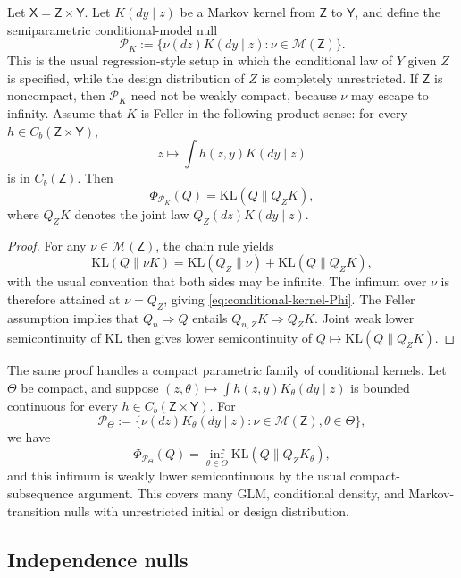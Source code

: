 \documentclass[11pt]{article}
\newcommand{\KL}{\mathrm{KL}}
\newcommand{\Pcal}{\mathcal{P}}
\newcommand{\X}{\mathsf{X}}
\newcommand{\M}{\mathcal{M}}
\theoremstyle{definition}
\theoremstyle{definition}
\begin{document}
Let \(\X=\mathsf Z\times\mathsf Y\).  Let \(K(dy\mid z)\) be a Markov kernel from \(\mathsf Z\) to \(\mathsf Y\), and define the semiparametric conditional-model null
\[
  \Pcal_K:=\{\nu(dz)K(dy\mid z):\nu\in\M(\mathsf Z)\}.
\]
This is the usual regression-style setup in which the conditional law of \(Y\) given \(Z\) is specified, while the design distribution of \(Z\) is completely unrestricted.  If \(\mathsf Z\) is noncompact, then \(\Pcal_K\) need not be weakly compact, because \(\nu\) may escape to infinity.  Assume that \(K\) is Feller in the following product sense: for every \(h\in C_b(\mathsf Z\times\mathsf Y)\),
\[
  z\mapsto \int h(z,y)K(dy\mid z)
\]
is in \(C_b(\mathsf Z)\).  Then
\begin{equation}\label{eq:conditional-kernel-Phi}
  \Phi_{\Pcal_K}(Q)
  =\KL(Q\|Q_ZK),
\end{equation}
where \(Q_ZK\) denotes the joint law \(Q_Z(dz)K(dy\mid z)\).

\begin{proof}
For any \(\nu\in\M(\mathsf Z)\), the chain rule yields
\[
  \KL(Q\|\nu K)
  =\KL(Q_Z\|\nu)+\KL(Q\|Q_ZK),
\]
with the usual convention that both sides may be infinite.  The infimum over \(\nu\) is therefore attained at \(\nu=Q_Z\), giving \eqref{eq:conditional-kernel-Phi}.  The Feller assumption implies that \(Q_n\Rightarrow Q\) entails \(Q_{n,Z}K\Rightarrow Q_ZK\).  Joint weak lower semicontinuity of KL then gives lower semicontinuity of \(Q\mapsto\KL(Q\|Q_ZK)\).
\end{proof}

The same proof handles a compact parametric family of conditional kernels.  Let \(\Theta\) be compact, and suppose \((z,\theta)\mapsto\int h(z,y)K_\theta(dy\mid z)\) is bounded continuous for every \(h\in C_b(\mathsf Z\times\mathsf Y)\).  For
\[
  \Pcal_\Theta:=\{\nu(dz)K_\theta(dy\mid z):\nu\in\M(\mathsf Z),\theta\in\Theta\},
\]
we have
\[
  \Phi_{\Pcal_\Theta}(Q)
  =\inf_{\theta\in\Theta}\KL(Q\|Q_ZK_\theta),
\]
and this infimum is weakly lower semicontinuous by the usual compact-subsequence argument.  This covers many GLM, conditional density, and Markov-transition nulls with unrestricted initial or design distribution.

\subsection{Independence nulls}
\end{document}
